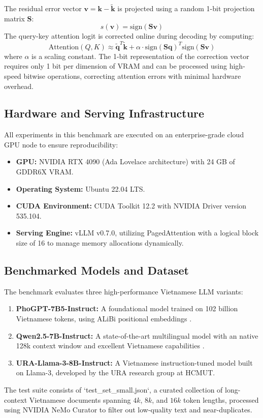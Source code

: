 The residual error vector $\mathbf{v} = \mathbf{k} - \tilde{\mathbf{k}}$ is projected using a random 1-bit projection matrix $\mathbf{S}$:
\begin{equation}
s(\mathbf{v}) = \text{sign}(\mathbf{S} \mathbf{v})
\end{equation}
The query-key attention logit is corrected online during decoding by computing:
\begin{equation}
\text{Attention}(Q, K) \approx \tilde{\mathbf{q}}^T \tilde{\mathbf{k}} + \alpha \cdot \text{sign}(\mathbf{S} \mathbf{q})^T \text{sign}(\mathbf{S} \mathbf{v})
\end{equation}
where $\alpha$ is a scaling constant. The 1-bit representation of the correction vector requires only 1 bit per dimension of VRAM and can be processed using high-speed bitwise operations, correcting attention errors with minimal hardware overhead.

\subsection{Hardware and Serving Infrastructure}
All experiments in this benchmark are executed on an enterprise-grade cloud GPU node to ensure reproducibility:
\begin{itemize}
    \item \textbf{GPU:} NVIDIA RTX 4090 (Ada Lovelace architecture) with 24 GB of GDDR6X VRAM.
    \item \textbf{Operating System:} Ubuntu 22.04 LTS.
    \item \textbf{CUDA Environment:} CUDA Toolkit 12.2 with NVIDIA Driver version 535.104.
    \item \textbf{Serving Engine:} vLLM v0.7.0, utilizing PagedAttention \cite{kwon2023pagedattention} with a logical block size of 16 to manage memory allocations dynamically.
\end{itemize}

\subsection{Benchmarked Models and Dataset}
The benchmark evaluates three high-performance Vietnamese LLM variants:
\begin{enumerate}
    \item \textbf{PhoGPT-7B5-Instruct:} A foundational model trained on 102 billion Vietnamese tokens, using ALiBi positional embeddings \cite{nguyen2023phogpt}.
    \item \textbf{Qwen2.5-7B-Instruct:} A state-of-the-art multilingual model with an native 128k context window and excellent Vietnamese capabilities \cite{qwen2024qwen25}.
    \item \textbf{URA-Llama-3-8B-Instruct:} A Vietnamese instruction-tuned model built on Llama-3, developed by the URA research group at HCMUT.
\end{enumerate}
The test suite consists of `test_set_small.json`, a curated collection of long-context Vietnamese documents spanning $4k$, $8k$, and $16k$ token lengths, processed using NVIDIA NeMo Curator to filter out low-quality text and near-duplicates.


